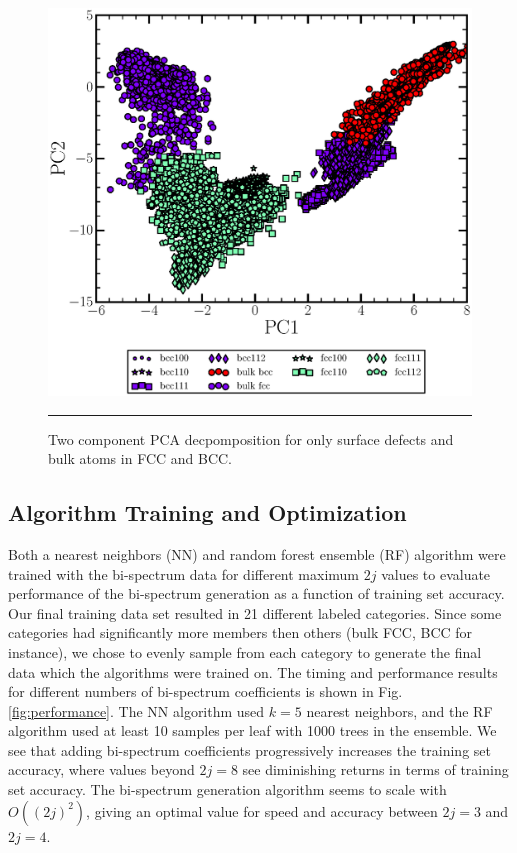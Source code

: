 \documentclass[12pt]{iopart}
\begin{document}
\begin{figure}[htbp]
  \centering
    \includegraphics[scale=0.5]{Figures/surfacePCA.eps}
    \rule{35em}{0.5pt}
  \caption[]{Two component PCA decpomposition for only surface defects and bulk atoms in FCC and BCC.}
  \label{fig:surfPCA}
\end{figure}

\subsection{Algorithm Training and Optimization}

Both a nearest neighbors (NN) and random forest ensemble (RF) algorithm\cite{Breiman2001} were trained with the bi-spectrum data for different maximum $2j$ values to evaluate performance of the bi-spectrum generation as a function of training set accuracy. Our final training data set resulted in 21 different labeled categories. Since some categories had significantly more members then others (bulk FCC, BCC for instance), we chose to evenly sample from each category to generate the final data which the algorithms were trained on. The timing and performance results for different numbers of bi-spectrum coefficients is shown in Fig. \ref{fig:performance}. The NN algorithm used $k=5$ nearest neighbors, and the RF algorithm used at least 10 samples per leaf with 1000 trees in the ensemble. We see that adding bi-spectrum coefficients progressively increases the training set accuracy, where values beyond $2j=8$ see diminishing returns in terms of training set accuracy. The bi-spectrum generation algorithm seems to scale with $O((2j)^2)$, giving an optimal value for speed and accuracy between $2j=3$ and $2j=4$.
\end{document}
